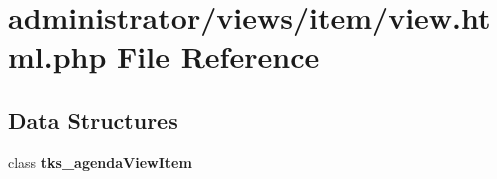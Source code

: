 \section{administrator/views/item/view.html.\+php File Reference}
\label{administrator_2views_2item_2view_8html_8php}
\subsection*{Data Structures}
\begin{DoxyCompactItemize}
\item 
class \textbf{ tks\+\_\+agenda\+View\+Item}
\end{DoxyCompactItemize}
